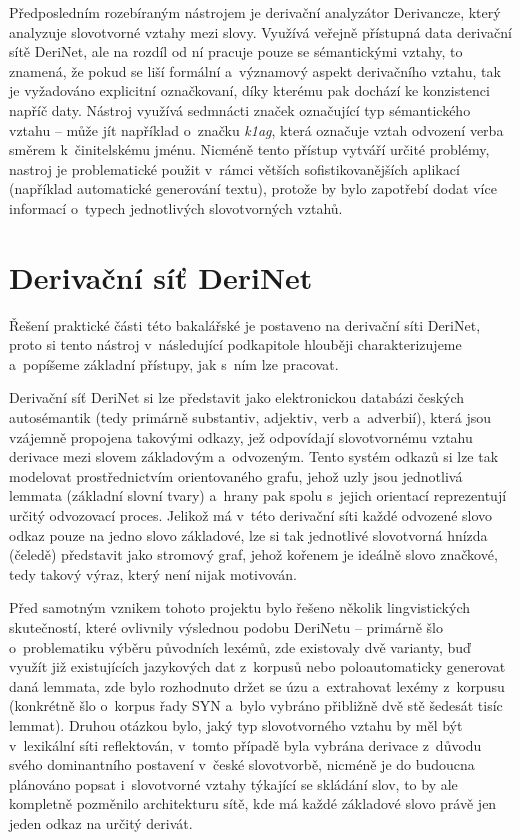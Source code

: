 Předposledním rozebíraným nástrojem je derivační analyzátor Derivancze,
který analyzuje slovotvorné vztahy mezi slovy. Využívá veřejně přístupná
data derivační sítě DeriNet, ale na rozdíl od ní pracuje pouze se
sémantickými vztahy, to znamená, že pokud se liší formální a~významový
aspekt derivačního vztahu, tak je vyžadováno explicitní označkovaní,
díky kterému pak dochází ke konzistenci napříč daty. Nástroj využívá
sedmnácti značek označující typ sémantického vztahu -- může jít
například o~značku \emph{k1ag}, která označuje vztah odvození verba
směrem k~činitelskému jménu. Nicméně tento přístup vytváří určité
problémy, nastroj je problematické použit v~rámci větších
sofistikovanějších aplikací (například automatické generování textu),
protože by bylo zapotřebí dodat více informací o~typech jednotlivých
slovotvorných vztahů.~\parencite{derivancze}

\hypertarget{derivaux10dnuxed-suxedux165-derinet}{%
\section{Derivační síť
DeriNet}\label{derivaux10dnuxed-suxedux165-derinet}}

Řešení praktické části této bakalářské je postaveno na derivační síti
DeriNet, proto si tento nástroj v~následující podkapitole hlouběji
charakterizujeme a~popíšeme základní přístupy, jak s~ním lze pracovat.

Derivační síť DeriNet si lze představit jako elektronickou databázi
českých autosémantik (tedy primárně substantiv, adjektiv, verb
a~adverbií), která jsou vzájemně propojena takovými odkazy, jež odpovídají
slovotvornému vztahu derivace mezi slovem základovým a~odvozeným. Tento
systém odkazů si lze tak modelovat prostřednictvím orientovaného grafu,
jehož uzly jsou jednotlivá lemmata (základní slovní tvary) a~hrany pak
spolu s~jejich orientací reprezentují určitý odvozovací proces. Jelikož
má v~této derivační síti každé odvozené slovo odkaz pouze na jedno slovo
základové, lze si tak jednotlivé slovotvorná hnízda (čeledě) představit
jako stromový graf, jehož kořenem je ideálně slovo značkové, tedy takový
výraz, který není nijak motivován.~\parencite{derinet-cz}

Před samotným vznikem tohoto projektu bylo řešeno několik lingvistických
skutečností, které ovlivnily výslednou podobu DeriNetu -- primárně šlo
o~problematiku výběru původních lexémů, zde existovaly dvě varianty, buď
využít již existujících jazykových dat z~korpusů nebo poloautomaticky
generovat daná lemmata, zde bylo rozhodnuto držet se úzu a~extrahovat
lexémy z~korpusu (konkrétně šlo o~korpus řady SYN a~bylo vybráno
přibližně dvě stě šedesát tisíc lemmat). Druhou otázkou bylo, jaký typ
slovotvorného vztahu by měl být v~lexikální síti reflektován, v~tomto
případě byla vybrána derivace z~důvodu svého dominantního postavení
v~české slovotvorbě, nicméně je do budoucna plánováno popsat i~slovotvorné
vztahy týkající se skládání slov, to by ale kompletně pozměnilo
architekturu sítě, kde má každé základové slovo právě jen jeden odkaz na
určitý derivát.~\parencite{sevcikova14}

